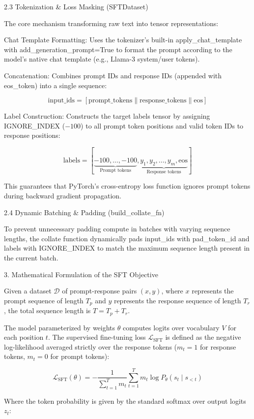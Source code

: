 2.3 Tokenization & Loss Masking (SFTDataset)

The core mechanism transforming raw text into tensor representations:

Chat Template Formatting: Uses the tokenizer's built-in apply_chat_template with add_generation_prompt=True to format the prompt according to the model's native chat template (e.g., Llama-3 system/user tokens).

Concatenation: Combines prompt IDs and response IDs (appended with eos_token) into a single sequence:


$$\text{input\_ids} = [\text{prompt\_tokens} \parallel \text{response\_tokens} \parallel \text{eos}]$$

Label Construction: Constructs the target labels tensor by assigning IGNORE_INDEX ($-100$) to all prompt token positions and valid token IDs to response positions:


$$\text{labels} = [\underbrace{-100, \dots, -100}_{\text{Prompt tokens}}, \underbrace{y_1, y_2, \dots, y_m, \text{eos}}_{\text{Response tokens}}]$$


This guarantees that PyTorch's cross-entropy loss function ignores prompt tokens during backward gradient propagation.

2.4 Dynamic Batching & Padding (build_collate_fn)

To prevent unnecessary padding compute in batches with varying sequence lengths, the collate function dynamically pads input_ids with pad_token_id and labels with IGNORE_INDEX to match the maximum sequence length present in the current batch.

3. Mathematical Formulation of the SFT Objective

Given a dataset $\mathcal{D}$ of prompt-response pairs $(x, y)$, where $x$ represents the prompt sequence of length $T_p$ and $y$ represents the response sequence of length $T_r$, the total sequence length is $T = T_p + T_r$.

The model parameterized by weights $\theta$ computes logits over vocabulary $V$ for each position $t$. The supervised fine-tuning loss $\mathcal{L}_{\text{SFT}}$ is defined as the negative log-likelihood averaged strictly over the response tokens ($m_t = 1$ for response tokens, $m_t = 0$ for prompt tokens):

$$\mathcal{L}_{\text{SFT}}(\theta) = -\frac{1}{\sum_{t=1}^{T} m_t} \sum_{t=1}^{T} m_t \log P_\theta(s_t \mid s_{<t})$$

Where the token probability is given by the standard softmax over output logits $z_t$:

